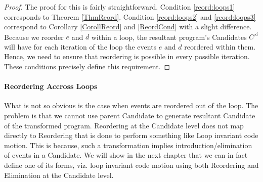         \begin{proof}
        
            The proof for this is fairly straightforward. 
            Condition \ref{reord:loops1} corresponds to Theorem \ref{ThmReord}. 
            Condition \ref{reord:loops2} and \ref{reord:loops3} correspond to Corollary \ref{CorollReord} and \ref{ReordCond} with a slight difference. 
            Because we reorder $e$ and $d$ within a loop, the resultant program's Candidates $C'^i$ will have for each iteration of the loop the events $e$ and $d$ reordered within them. 
            Hence, we need to ensure that reordering is possible in every possible iteration. 
            These conditions precisely define this requirement\footnotemark. 
            

        \end{proof}

        \paragraph{Reordering Accross Loops}
            What is not so obvious is the case when events are reordered out of the loop. 
            The problem is that we cannot use parent Candidate to generate resultant Candidate of the transformed program. 
            Reordering at the Candidate level does not map directly to Reordering that is done to perform something like Loop invariant code motion. 
            This is because, such a transformation implies introduction/elimination of events in a Candidate.
            We will show in the next chapter that we can in fact define one of its forms, viz. loop invariant code motion using both Reordering and Elimination at the Candidate level.
             
    
